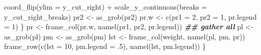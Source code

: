 \documentclass[
]{article}
\newenvironment{Shaded}{\begin{snugshade}}{\end{snugshade}}
\newcommand{\AttributeTok}[1]{\textcolor[rgb]{0.77,0.63,0.00}{#1}}
\newcommand{\DecValTok}[1]{\textcolor[rgb]{0.00,0.00,0.81}{#1}}
\newcommand{\DocumentationTok}[1]{\textcolor[rgb]{0.56,0.35,0.01}{\textbf{\textit{#1}}}}
\newcommand{\FunctionTok}[1]{\textcolor[rgb]{0.00,0.00,0.00}{#1}}
\newcommand{\NormalTok}[1]{#1}
\newcommand{\OtherTok}[1]{\textcolor[rgb]{0.56,0.35,0.01}{#1}}
\newcommand{\SpecialCharTok}[1]{\textcolor[rgb]{0.00,0.00,0.00}{#1}}
\begin{document}
\begin{Shaded}
\begin{Highlighting}[]
        \FunctionTok{coord\_flip}\NormalTok{(}\AttributeTok{ylim =}\NormalTok{ y\_cut\_right) }\SpecialCharTok{+}
        \FunctionTok{scale\_y\_continuous}\NormalTok{(}\AttributeTok{breaks =}\NormalTok{ y\_cut\_right\_breaks)}
\NormalTok{      pr2 }\OtherTok{\textless{}{-}} \FunctionTok{as\_grob}\NormalTok{(pr2)}
\NormalTok{      pr.w }\OtherTok{\textless{}{-}} \FunctionTok{c}\NormalTok{(}\AttributeTok{pr1 =} \DecValTok{2}\NormalTok{, }\AttributeTok{pr2 =} \DecValTok{1}\NormalTok{, }\AttributeTok{pr.legend =} \DecValTok{1}\NormalTok{)}
\NormalTok{    \}}
\NormalTok{    pr }\OtherTok{\textless{}{-}} \FunctionTok{frame\_col}\NormalTok{(pr.w, }\FunctionTok{namel}\NormalTok{(pr1, pr2, pr.legend))}
    \DocumentationTok{\#\# gather all}
\NormalTok{    pl }\OtherTok{\textless{}{-}} \FunctionTok{as\_grob}\NormalTok{(pl)}
\NormalTok{    pm }\OtherTok{\textless{}{-}} \FunctionTok{as\_grob}\NormalTok{(pm)}
\NormalTok{    lst }\OtherTok{\textless{}{-}} \FunctionTok{frame\_col}\NormalTok{(weight, }\FunctionTok{namel}\NormalTok{(pl, pm, pr))}
    \FunctionTok{frame\_row}\NormalTok{(}\FunctionTok{c}\NormalTok{(}\AttributeTok{lst =} \DecValTok{10}\NormalTok{, }\AttributeTok{pm.legend =}\NormalTok{ .}\DecValTok{5}\NormalTok{), }\FunctionTok{namel}\NormalTok{(lst, pm.legend))}
\NormalTok{  \}}


\end{Highlighting}
\end{Shaded}
\end{document}
